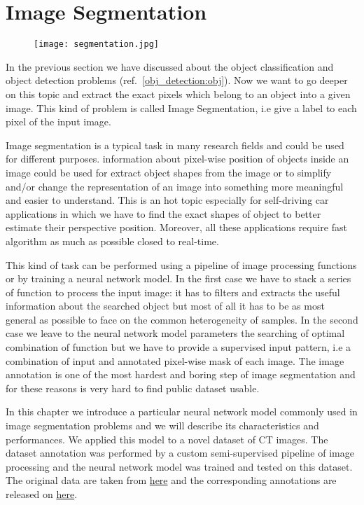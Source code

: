 \documentclass{standalone}
\begin{document}
\section[Segmentation]{Image Segmentation}\label{segmentation:unet}

\begin{center}
\begin{figure}[htbp]
\centering
\texttt{[image: segmentation.jpg]}
\label{fig:segmentation}
\end{figure}
\end{center}

In the previous section we have discussed about the object classification and object detection problems (ref.~\ref{obj_detection:obj}).
Now we want to go deeper on this topic and extract the exact pixels which belong to an object into a given image.
This kind of problem is called Image Segmentation, i.e give a label to each pixel of the input image.

Image segmentation is a typical task in many research fields and could be used for different purposes.
information about pixel-wise position of objects inside an image could be used for extract object shapes from the image or to simplify and/or change the representation of an image into something more meaningful and easier to understand.
This is an hot topic especially for self-driving car applications in which we have to find the exact shapes of object to better estimate their perspective position.
Moreover, all these applications require fast algorithm as much as possible closed to real-time.

This kind of task can be performed using a pipeline of image processing functions or by training a neural network model.
In the first case we have to stack a series of function to process the input image: it has to filters and extracts the useful information about the searched object but most of all it has to be as most general as possible to face on the common heterogeneity of samples.
In the second case we leave to the neural network model parameters the searching of optimal combination of function but we have to provide a supervised input pattern, i.e a combination of input and annotated pixel-wise mask of each image.
The image annotation is one of the most hardest and boring step of image segmentation and for these reasons is very hard to find public dataset usable.

In this chapter we introduce a particular neural network model commonly used in image segmentation problems and we will describe its characteristics and performances.
We applied this model to a novel dataset of CT images.
The dataset annotation was performed by a custom semi-supervised pipeline of image processing and the neural network model was trained and tested on this dataset.
The original data are taken from \href{}{here} and the corresponding annotations are released on \href{}{here}.
\end{document}
